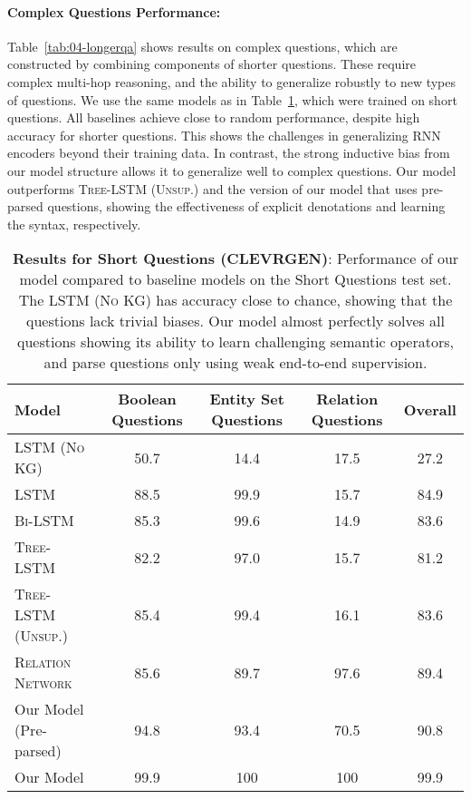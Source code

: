 \documentclass[main.tex]{subfiles}
\begin{document}
\paragraph{Complex Questions Performance:}
Table~\ref{tab:04-longerqa} shows results on complex questions, which are constructed by combining components of shorter questions.
These require complex multi-hop reasoning, and the ability to generalize robustly to new types of questions.
We use the same models as in Table~\ref{tab:04-qa}, which were trained on short questions.
All baselines achieve close to random performance, despite high accuracy for shorter questions. This shows the challenges in generalizing RNN encoders
beyond their training data.
In contrast, the strong inductive bias from our model structure allows it to generalize well to  complex questions.
Our model outperforms \textsc{Tree-LSTM (Unsup.)} and the version of our model that uses pre-parsed questions, showing the effectiveness of explicit denotations and learning the syntax, respectively.

\begin{table}[tb]
\centering
\footnotesize
\begin{tabular}{l c c c c}
\toprule
\bf Model & \bf Boolean Questions & \bf Entity Set Questions & \bf Relation Questions & \bf Overall \\
\midrule
\textsc{LSTM (No KG)}               & 50.7 & 14.4 & 17.5  & 27.2 \\
\textsc{LSTM }                      & 88.5 & 99.9 & 15.7  & 84.9 \\
\textsc{Bi-LSTM }                   & 85.3 & 99.6 & 14.9  & 83.6 \\
\textsc{Tree-LSTM}                  & 82.2 & 97.0 & 15.7  & 81.2 \\
\textsc{Tree-LSTM (Unsup.)}         & 85.4 & 99.4 & 16.1  & 83.6 \\
\textsc{Relation Network}           & 85.6 & 89.7 & 97.6  & 89.4 \\
\addlinespace[1mm]
Our Model (Pre-parsed)              & 94.8 & 93.4   & 70.5  & 90.8 \\
Our Model                           & 99.9 & 100    & 100   & 99.9 \\
\bottomrule
\end{tabular}
\caption{\label{tab:04-qa}\textbf{Results for Short Questions (\textsc{CLEVRGEN})}: Performance of our model compared to baseline models on the Short Questions test set. The \textsc{LSTM (No KG)} has accuracy close to chance, showing that the questions lack trivial biases. %
Our model almost perfectly solves all questions showing its ability to learn challenging semantic operators, and parse questions only using weak end-to-end supervision.}
\end{table}
\end{document}
